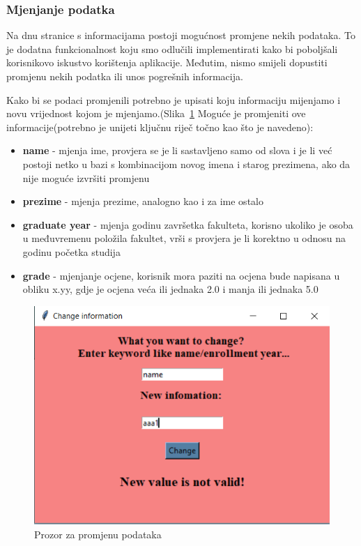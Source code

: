 \documentclass[titlepage, 12pt]{scrartcl}
\begin{document}
	\subsubsection{Mjenjanje podatka}
	
	Na dnu stranice s informacijama postoji mogućnost promjene nekih podataka. To je dodatna funkcionalnost koju smo odlučili implementirati kako bi poboljšali korisnikovo iskustvo korištenja aplikacije. Međutim, nismo smijeli dopustiti promjenu nekih podatka ili unos pogrešnih informacija.  
	
	Kako bi se podaci promjenili potrebno je upisati koju informaciju mijenjamo i novu vrijednost kojom je mjenjamo.(Slika~\ref{fig:change} Moguće je promjeniti ove informacije(potrebno je unijeti ključnu riječ točno kao što je navedeno):
	\begin{samepage}
		
		
		\begin{itemize}
			\item \textbf{name} - mjenja ime, provjera se je li sastavljeno samo od slova i je li već postoji netko u bazi s kombinacijom novog imena i starog prezimena, ako da nije moguće izvršiti promjenu
			\item \textbf{prezime} - mjenja prezime, analogno kao i za ime ostalo
			\item \textbf{graduate year} - mjenja godinu završetka fakulteta, korisno ukoliko je osoba u međuvremenu položila fakultet, vrši s provjera je li korektno u odnosu na godinu početka studija
			\item \textbf{grade} - mjenjanje ocjene, korisnik mora paziti na ocjena bude napisana u obliku x.yy, gdje je ocjena veća ili jednaka 2.0 i manja ili jednaka 5.0 
		\end{itemize}
	\end{samepage}
	
	\begin{figure}
		\begin{center}
			\includegraphics[scale=0.9]{slike/change.png}
			\caption{Prozor za promjenu podataka}
			\label{fig:change} 
		\end{center}
	\end{figure}
	
\end{document}

